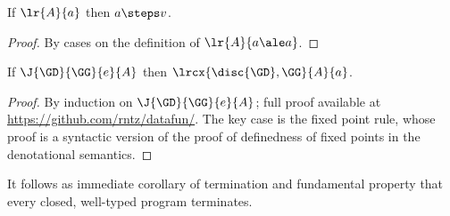 \begin{theorem}[Termination]
  If $\lr{A}{a}$ then $a \steps v$.
\end{theorem}
\begin{proof}
  By cases on the definition of $\lr{A}{a \ale a}$.
\end{proof}

\begin{theorem}
  If $\J{\GD}{\GG}{e}{A}$ then $\lrcx{\disc{\GD},\GG}{A}{a}$.
\end{theorem}
\begin{proof}
  By induction on $\J{\GD}{\GG}{e}{A}$; full proof available at
  \url{https://github.com/rntz/datafun/}. The key case is the fixed point rule,
  whose proof is a syntactic version of the proof of definedness of fixed points
  in the denotational semantics.
\end{proof}

It follows as immediate corollary of termination and fundamental property that
every closed, well-typed program terminates. 
